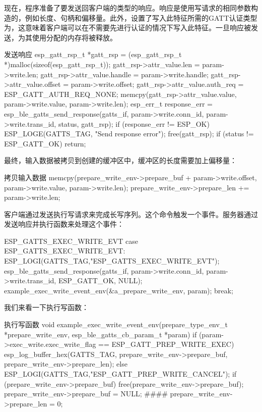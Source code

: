 \documentclass[lang=cn,newtx,10pt,scheme=chinese]{elegantbook}
\begin{document}
现在，程序准备了要发送回客户端的类型的响应。响应是使用写请求的相同参数构造的，例如长度、句柄和偏移量。此外，设置了写入此特征所需的GATT认证类型为，这意味着客户端可以在不需要先进行认证的情况下写入此特征。一旦响应被发送，为其使用分配的内存将被释放。

\begin{mycode}{发送响应}
esp_gatt_rsp_t *gatt_rsp = (esp_gatt_rsp_t *)malloc(sizeof(esp_gatt_rsp_t));
gatt_rsp->attr_value.len = param->write.len;
gatt_rsp->attr_value.handle = param->write.handle;
gatt_rsp->attr_value.offset = param->write.offset;
gatt_rsp->attr_value.auth_req = ESP_GATT_AUTH_REQ_NONE;
memcpy(gatt_rsp->attr_value.value, param->write.value, param->write.len);
esp_err_t response_err = esp_ble_gatts_send_response(gatts_if, param->write.conn_id,  
                                                     param->write.trans_id, status, gatt_rsp);
if (response_err != ESP_OK){
	ESP_LOGE(GATTS_TAG, "Send response error\n");
}
free(gatt_rsp);
if (status != ESP_GATT_OK){
	return;
}
\end{mycode}

最终，输入数据被拷贝到创建的缓冲区中，缓冲区的长度需要加上偏移量：

\begin{mycode}{拷贝输入数据}
memcpy(prepare_write_env->prepare_buf + param->write.offset,
       param->write.value,  
       param->write.len);
prepare_write_env->prepare_len += param->write.len;
\end{mycode}

客户端通过发送执行写请求来完成长写序列。这个命令触发一个事件。服务器通过发送响应并执行函数来处理这个事件：

\begin{mycode}{ESP\_GATTS\_EXEC\_WRITE\_EVT}
case ESP_GATTS_EXEC_WRITE_EVT:  
     ESP_LOGI(GATTS_TAG,"ESP_GATTS_EXEC_WRITE_EVT");  
     esp_ble_gatts_send_response(gatts_if, param->write.conn_id, param->write.trans_id, ESP_GATT_OK, NULL);  
     example_exec_write_event_env(&a_prepare_write_env, param);  
     break;
\end{mycode}

我们来看一下执行写函数：

\begin{mycode}{执行写函数}
void example_exec_write_event_env(prepare_type_env_t *prepare_write_env, esp_ble_gatts_cb_param_t *param){
    if (param->exec_write.exec_write_flag == ESP_GATT_PREP_WRITE_EXEC){
        esp_log_buffer_hex(GATTS_TAG, prepare_write_env->prepare_buf, prepare_write_env->prepare_len);
    }
    else{
        ESP_LOGI(GATTS_TAG,"ESP_GATT_PREP_WRITE_CANCEL");
    }
    if (prepare_write_env->prepare_buf) {
        free(prepare_write_env->prepare_buf);
        prepare_write_env->prepare_buf = NULL;
    }
####     prepare_write_env->prepare_len = 0;
}
\end{mycode}
\end{document}
